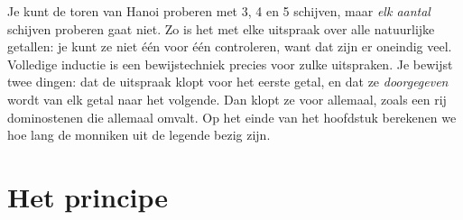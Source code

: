 Je kunt de toren van Hanoi proberen met 3, 4 en 5 schijven, maar \textit{elk aantal} schijven proberen gaat niet. Zo is het met elke uitspraak over alle natuurlijke getallen: je kunt ze niet één voor één controleren, want dat zijn er oneindig veel. Volledige inductie is een bewijstechniek precies voor zulke uitspraken. Je bewijst twee dingen: dat de uitspraak klopt voor het eerste getal, en dat ze \textit{doorgegeven} wordt van elk getal naar het volgende. Dan klopt ze voor allemaal, zoals een rij dominostenen die allemaal omvalt. Op het einde van het hoofdstuk berekenen we hoe lang de monniken uit de legende bezig zijn.

\begin{oefeningen}[Start]

\end{oefeningen}

\section{Het principe}\label{sec:h3-principe}

